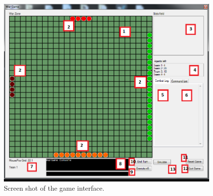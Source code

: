 \begin{figure}[H]
\begin{center}
\includegraphics[scale=0.6]{Images/game_interface_2.png}
\end{center}
\caption{Screen shot of the game interface.}
\label{game_interface}
\end{figure}

